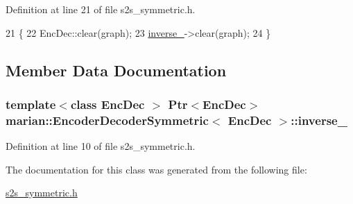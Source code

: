 Definition at line 21 of file s2s\+\_\+symmetric.\+h.


\begin{DoxyCode}
21                                                  \{
22     EncDec::clear(graph);
23     \hyperlink{classmarian_1_1EncoderDecoderSymmetric_a528d0f3b8902ccb3a1464fb7312d5c17}{inverse\_}->clear(graph);
24   \}
\end{DoxyCode}


\subsection{Member Data Documentation}
\subsubsection[{\texorpdfstring{inverse\+\_\+}{inverse_}}]{\setlength{\rightskip}{0pt plus 5cm}template$<$class Enc\+Dec $>$ {\bf Ptr}$<$Enc\+Dec$>$ {\bf marian\+::\+Encoder\+Decoder\+Symmetric}$<$ Enc\+Dec $>$\+::inverse\+\_\+\hspace{0.3cm}{\ttfamily [private]}}\hypertarget{classmarian_1_1EncoderDecoderSymmetric_a528d0f3b8902ccb3a1464fb7312d5c17}{}\label{classmarian_1_1EncoderDecoderSymmetric_a528d0f3b8902ccb3a1464fb7312d5c17}


Definition at line 10 of file s2s\+\_\+symmetric.\+h.



The documentation for this class was generated from the following file\+:\begin{DoxyCompactItemize}
\item 
\hyperlink{s2s__symmetric_8h}{s2s\+\_\+symmetric.\+h}\end{DoxyCompactItemize}
